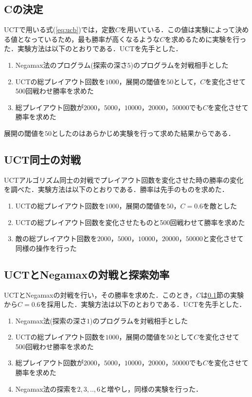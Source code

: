 \documentclass{jarticle}
\begin{document}
\subsection{Cの決定}
\label{sec:seek_c}
UCTで用いる式(\ref{eq:ucb})では，定数$C$を用いている．この値は実験によって決める値となっているため，最も勝率が高くなるような$C$を求めるために実験を行った．実験方法は以下のとおりである．UCTを先手とした．
\begin{enumerate}
	\item Negamax法のプログラム(探索の深さ$5$)のプログラムを対戦相手とした
	\item UCTの総プレイアウト回数を$1000$，展開の閾値を$50$として，$C$を変化させて500回戦わせ勝率を求めた
	\item 総プレイアウト回数が$2000$，$5000$，$10000$，$20000$，$50000$でも$C$を変化させて勝率を求めた
\end{enumerate}

展開の閾値を$50$としたのはあらかじめ実験を行って求めた結果からである．


\subsection{UCT同士の対戦}
UCTアルゴリズム同士の対戦でプレイアウト回数を変化させた時の勝率の変化を調べた．実験方法は以下のとおりである．勝率は先手のものを求めた．
\begin{enumerate}
	\item UCTの総プレイアウト回数を$1000$，展開の閾値を$50$，$C=0.6$を敵とした
	\item UCTの総プレイアウト回数を変化させたものと500回戦わせて勝率を求めた
	\item 敵の総プレイアウト回数を$2000$，$5000$，$10000$，$20000$，$50000$と変化させて同様の操作を行った
\end{enumerate}




\subsection{UCTとNegamaxの対戦と探索効率}
UCTとNegamaxの対戦を行い，その勝率を求めた．このとき，$C$は\ref{sec:seek_c}節の実験から$C=0.6$を採用した．実験方法は以下のとおりである．UCTを先手とした．

\begin{enumerate}
	\item Negamax法(探索の深さ$1$)のプログラムを対戦相手とした
	\item UCTの総プレイアウト回数を$1000$，展開の閾値を$50$として$C$を変化させて500回戦わせ勝率を求めた
	\item 総プレイアウト回数が$2000$，$5000$，$10000$，$20000$，$50000$でも$C$を変化させて勝率を求めた
	\item Negamax法の探索を$2,3,..,6$と増やし，同様の実験を行った．
\end{enumerate}
\end{document}
